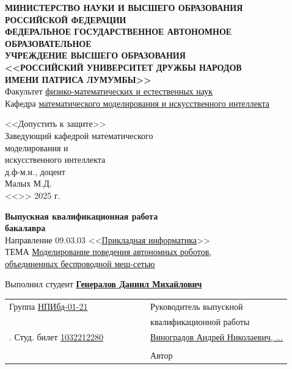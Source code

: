 \documentclass[%
]{report}
\begin{document}
\begin{titlepage}

  \begin{center}
  \hfill \break
  \textbf{МИНИСТЕРСТВО НАУКИ И ВЫСШЕГО ОБРАЗОВАНИЯ}\\
  \textbf{РОССИЙСКОЙ ФЕДЕРАЦИИ}\\
  \textbf{ФЕДЕРАЛЬНОЕ ГОСУДАРСТВЕННОЕ АВТОНОМНОЕ ОБРАЗОВАТЕЛЬНОЕ}\\
  \textbf{УЧРЕЖДЕНИЕ ВЫСШЕГО ОБРАЗОВАНИЯ}\\
  \textbf{<<РОССИЙСКИЙ УНИВЕРСИТЕТ ДРУЖБЫ НАРОДОВ}\\
  \textbf{ИМЕНИ ПАТРИСА ЛУМУМБЫ>>}\\
  \normalsize{Факультет \underline{физико-математических и естественных наук}}\\ 
  \normalsize{Кафедра \underline{математического моделирования и искусственного интеллекта}}\\

  \vspace*{\fill}

  \begin{flushright}
    \large{<<Допустить к защите>>}\\
    \normalsize{Заведующий кафедрой} 
    \normalsize{математического \\ моделирования и \\ искусственного интеллекта \\} 
    \normalsize{д.ф-м.н., доцент \\} 
    \underline{\phantom{signature signature}} Малых М.Д. \\
    <<\underline{\phantom{day}}>> \underline{\phantom{month month}} 2025 г.
    \end{flushright}
 
  \vspace*{\fill}
  \Large{\textbf{Выпускная квалификационная работа\\ бакалавра}}
  \\
  \normalsize
  Направление  09.03.03 <<\underline{Прикладная информатика}>>
  \\
  ТЕМА \underline{Моделирование поведения автономных роботов,} \\
  \underline{объединенных беспроводной меш-сетью}
  \vspace*{\fill}
  
  Выполнил студент \underline{\textbf{Генералов Даниил Михайлович}}
  \end{center}
  
  \noindent \begin{tabular}{p{0.5\linewidth} p{0.5\linewidth}}
      Группа \underline{НПИбд-01-21} & Руководитель выпускной  \\
      & квалификационной работы \\.
      Студ. билет \textnumero{} \underline{1032212280} & \underline{Виноградов Андрей Николаевич, ...}\\
      & \underline{\phantom{signature signature}} \\
      & Автор \underline{\phantom{signature signature}} \\
    \end{tabular}
   \vspace*{\fill}
   

\end{titlepage}
\end{document}
